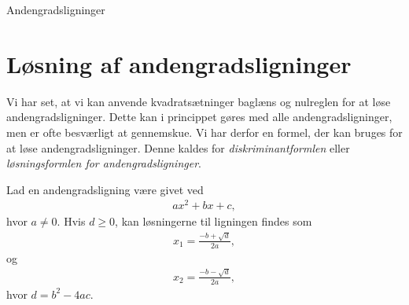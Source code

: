 
\begin{center}
\Huge
	Andengradsligninger
\end{center}

\section*{Løsning af andengradsligninger}
Vi har set, at vi kan anvende kvadratsætninger baglæns og nulreglen for at løse andengradsligninger. Dette kan i princippet gøres med alle andengradsligninger, men er ofte besværligt at gennemskue. Vi har derfor en formel, der kan bruges for at løse andengradsligninger. Denne kaldes for \textit{diskriminantformlen} eller \textit{løsningsformlen for andengradsligninger}.
\begin{setn}[Diskriminantformlen]
	Lad en andengradsligning være givet ved
	\begin{align*}
		ax^2 + bx + c,
	\end{align*}
	hvor $a \neq 0$. Hvis $d \geq 0$, kan løsningerne til ligningen findes som
	\begin{align*}
		x_1 = \frac{-b+ \sqrt{d}}{2a},
	\end{align*}
	og
	\begin{align*}
		x_2 = \frac{-b - \sqrt{d}}{2a},
	\end{align*}
	hvor $d = b^2 - 4ac$. 
\end{setn}
